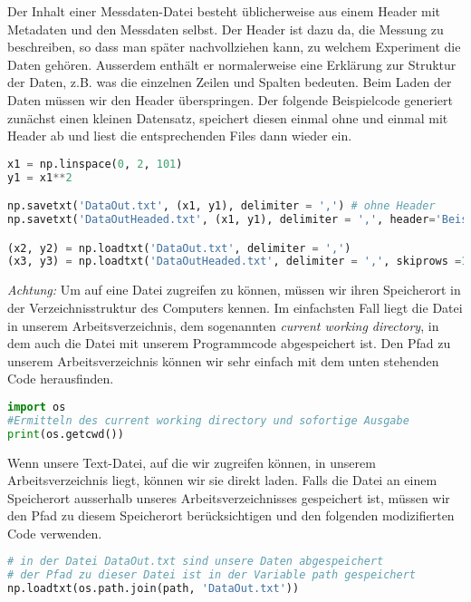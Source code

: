 Der Inhalt einer Messdaten-Datei besteht üblicherweise aus einem Header mit Metadaten und den Messdaten selbst. Der Header ist dazu da, die Messung zu beschreiben, so dass man später nachvollziehen kann, zu welchem Experiment die Daten gehören. Ausserdem enthält er normalerweise eine Erklärung zur Struktur der Daten, z.B. was die einzelnen Zeilen und Spalten bedeuten. Beim Laden der Daten müssen wir den Header überspringen. Der folgende Beispielcode generiert zunächst einen kleinen Datensatz, speichert diesen einmal ohne und einmal mit Header ab und liest die entsprechenden Files dann wieder ein.

\begin{lstlisting}[language = Python]
x1 = np.linspace(0, 2, 101)
y1 = x1**2

np.savetxt('DataOut.txt', (x1, y1), delimiter = ',') # ohne Header
np.savetxt('DataOutHeaded.txt', (x1, y1), delimiter = ',', header='Beispieldatei') # mit Header

(x2, y2) = np.loadtxt('DataOut.txt', delimiter = ',')
(x3, y3) = np.loadtxt('DataOutHeaded.txt', delimiter = ',', skiprows =1)
\end{lstlisting}



\textit{Achtung:} Um auf eine Datei zugreifen zu können, müssen wir ihren Speicherort in der Verzeichnisstruktur des Computers kennen. Im einfachsten Fall liegt die Datei in unserem Arbeitsverzeichnis, dem sogenannten \textit{current working directory}, in dem auch die Datei mit unserem Programmcode abgespeichert ist. Den Pfad zu unserem Arbeitsverzeichnis können wir sehr einfach mit dem unten stehenden Code herausfinden.  
\begin{lstlisting}[language = Python]
import os
#Ermitteln des current working directory und sofortige Ausgabe
print(os.getcwd())
\end{lstlisting}
Wenn unsere Text-Datei, auf die wir zugreifen können, in unserem Arbeitsverzeichnis liegt, können wir sie direkt laden. Falls die Datei an einem Speicherort ausserhalb unseres Arbeitsverzeichnisses gespeichert ist, müssen wir den Pfad zu diesem Speicherort berücksichtigen und den folgenden modizifierten Code verwenden.
\begin{lstlisting}[language = Python]
# in der Datei DataOut.txt sind unsere Daten abgespeichert
# der Pfad zu dieser Datei ist in der Variable path gespeichert 
np.loadtxt(os.path.join(path, 'DataOut.txt'))
\end{lstlisting}







